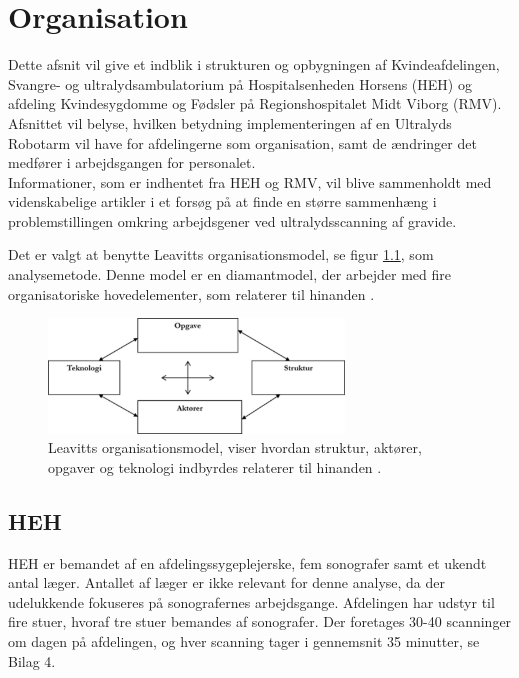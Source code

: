 \chapter{Organisation} \label{Organisation}
Dette afsnit vil give et indblik i strukturen og opbygningen af Kvindeafdelingen, Svangre- og ultralydsambulatorium på Hospitalsenheden Horsens (HEH) og afdeling Kvindesygdomme og Fødsler på Regionshospitalet Midt Viborg (RMV). Afsnittet vil belyse, hvilken betydning implementeringen af en Ultralyds Robotarm vil have for afdelingerne som organisation, samt de ændringer det medfører i arbejdsgangen for personalet. \\
Informationer, som er indhentet fra HEH og RMV, vil blive sammenholdt med videnskabelige artikler i et forsøg på at finde en større sammenhæng i problemstillingen omkring arbejdsgener ved ultralydsscanning af gravide. 

Det er valgt at benytte Leavitts organisationsmodel, se figur \ref{DiamantModel}, som analysemetode. Denne model er en diamantmodel, der arbejder med fire organisatoriske hovedelementer, som relaterer til hinanden \cite{Leavitt}\cite{diamantmodel}. 

\begin{figure}[h!]\centering
	\includegraphics[width = 0.7\textwidth]{Figurer/LeavittModel}
	\caption{Leavitts organisationsmodel, viser hvordan struktur, aktører, opgaver og teknologi indbyrdes relaterer til hinanden \cite{diamantmodel}.}
	\label{DiamantModel}
\end{figure}

\section{HEH}
HEH er bemandet af en afdelingssygeplejerske, fem sonografer samt et ukendt antal læger. Antallet af læger er ikke relevant for denne analyse, da der udelukkende fokuseres på sonografernes arbejdsgange.
Afdelingen har udstyr til fire stuer, hvoraf tre stuer bemandes af sonografer. Der foretages 30-40 scanninger om dagen på afdelingen, og hver scanning tager i gennemsnit 35 minutter, se Bilag 4. 

